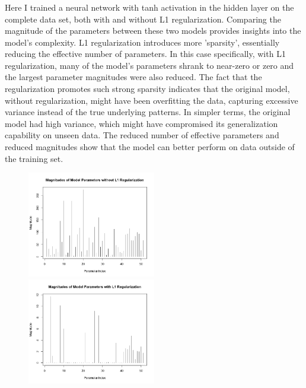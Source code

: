 \documentclass[12pt]{article}
\begin{document}
\newpage

\subsubsection{}
Here I trained a neural network with tanh activation in the hidden layer on the complete data set, both with and without L1 regularization. Comparing the magnitude of the parameters between these two models provides insights into the model's complexity. L1 regularization introduces more 'sparsity', essentially reducing the effective number of parameters. In this case specifically, with L1 regularization, many of the model's parameters shrank to near-zero or zero and the largest parameter magnitudes were also reduced. The fact that the regularization promotes such strong sparsity indicates that the original model, without regularization, might have been overfitting the data, capturing excessive variance instead of the true underlying patterns. In simpler terms, the original model had high variance, which might have compromised its generalization capability on unseen data. The reduced number of effective parameters and reduced magnitudes show that the model can better perform on data outside of the training set.

 
\begin{figure}[!ht]
\centering
\includegraphics[width=0.5\textwidth]{question_e_plot_B.png}
\includegraphics[width=0.5\textwidth]{question_e_plot_A.png}
\end{figure}
\end{document}
